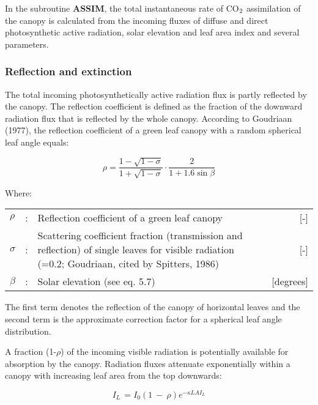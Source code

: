 In the subroutine {\bf ASSIM}, the total instantaneous rate of CO$_{{\rm 2}}$ assimilation of the canopy is
calculated from the incoming fluxes of diffuse and direct photosynthetic active radiation,
solar elevation and leaf area index and several parameters.

\subsubsection{Reflection and extinction}
The total incoming photosynthetically active radiation flux is partly reflected by the
canopy. The reflection coefficient is defined as the fraction of the downward radiation
flux that is reflected by the whole canopy. According to Goudriaan (1977), the reflection
coefficient of a green leaf canopy with a random spherical leaf angle equals:

\begin{equation}
\rho = {\frac{1- \sqrt{1-\sigma}}{1 + \sqrt{1-\sigma}}} \cdot {\frac{2}{1+1.6 \sin \beta }}
\end{equation}

Where:\\[5pt]
\begin{tabularx}{\textwidth}{llXr}
$\rho$ &:& Reflection coefficient of a green leaf canopy    &    [-]\\
$\sigma$ &:& Scattering coefficient fraction (transmission and reflection) 
   of single leaves for visible radiation   
   {\small (=0.2; Goudriaan, cited by Spitters, 1986)}  &     [-]\\  
$\beta$ &:& Solar elevation (see eq. 5.7)    &    [degrees]\\
\end{tabularx}
 
The first term denotes the reflection of the canopy of horizontal leaves and the second
term is the approximate correction factor for a spherical leaf angle distribution.

A fraction (1-$\rho$) of the incoming visible radiation is potentially available for absorption by
the canopy. Radiation fluxes attenuate exponentially within a canopy with increasing leaf
area from the top downwards:

\begin{equation}
I_{L~} = I_{0} (1~-~\rho ) e^{-\kappa LAI_{L} }
\end{equation}

